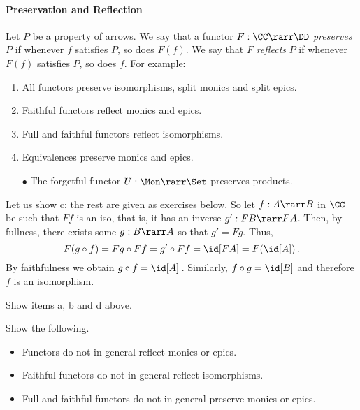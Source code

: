 \documentclass{svmult}
\begin{document}
\paragraph{Preservation and Reflection}
Let $P$ be a property of arrows. We say that a functor $F :\CC \rarr \DD$ \emph{preserves} $P$ if whenever $f$ satisfies $P$, so does $F(f)$. We say
that $F$ \emph{reflects} $P$ if whenever $F(f)$ satisfies $P$, so does $f$. For example:
\begin{enumerate}\renewcommand{\theenumi}{\normalfont\alph{enumi}}
\item All functors preserve isomorphisms, split monics and split epics.
\item Faithful functors reflect monics and epics.
\item Full and faithful functors reflect isomorphisms.
\item Equivalences preserve monics and epics.
\item[$\bullet$\;] The forgetful functor $U:\Mon\rarr\Set$ preserves products.
\end{enumerate}
Let us show c; the rest are given as exercises below. So let $f:A\rarr B$ in $\CC$ be such that $Ff$ is an iso, that is, it has an inverse $g':FB\rarr
FA$. Then, by fullness, there exists some $g:B\rarr A$ so that $g'=Fg$. Thus,
\[ F(g\circ f)=Fg\circ Ff=g'\circ Ff=\id[FA]=F(\id[A])\,. \]
By faithfulness we obtain $g\circ f=\id[A]$\,. Similarly, $f\circ g=\id[B]$ and therefore $f$ is an isomorphism.

\begin{myexercise}
Show items a, b and d above.
\end{myexercise}
\begin{myexercise}
Show the following.
\begin{itemize}
  \item Functors do not in general reflect monics or epics.
  \item Faithful functors do not in general reflect isomorphisms.
  \item Full and faithful functors do not in general preserve monics or epics.
\end{itemize}
\end{myexercise}
\end{document}
